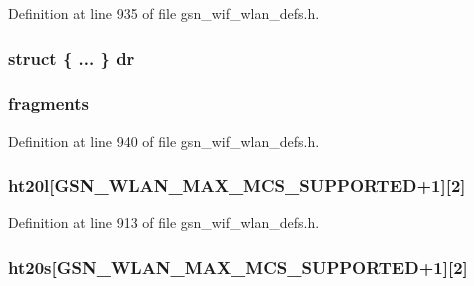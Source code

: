 Definition at line 935 of file gsn\_\-wif\_\-wlan\_\-defs.h.

\hypertarget{a00410_a01138127fe90db703f2c45ded1bed4aa}{
\subsubsection[{dr}]{\setlength{\rightskip}{0pt plus 5cm}struct \{ ... \}   {\bf dr}}}
\label{a00410_a01138127fe90db703f2c45ded1bed4aa}
\hypertarget{a00410_a73de443bdd62ccc7fa8fc68faf358974}{
\subsubsection[{fragments}]{ {\bf fragments}}}
\label{a00410_a73de443bdd62ccc7fa8fc68faf358974}


Definition at line 940 of file gsn\_\-wif\_\-wlan\_\-defs.h.

\hypertarget{a00410_a5512e7cbb968332fffc963132021c2a9}{
\subsubsection[{ht20l}]{ {\bf ht20l}\mbox{[}GSN\_\-WLAN\_\-MAX\_\-MCS\_\-SUPPORTED+1\mbox{]}\mbox{[}2\mbox{]}}}
\label{a00410_a5512e7cbb968332fffc963132021c2a9}


Definition at line 913 of file gsn\_\-wif\_\-wlan\_\-defs.h.

\hypertarget{a00410_ac3156ecb8d65f7e4aac2caf45fff0d1a}{
\subsubsection[{ht20s}]{ {\bf ht20s}\mbox{[}GSN\_\-WLAN\_\-MAX\_\-MCS\_\-SUPPORTED+1\mbox{]}\mbox{[}2\mbox{]}}}
\label{a00410_ac3156ecb8d65f7e4aac2caf45fff0d1a}


